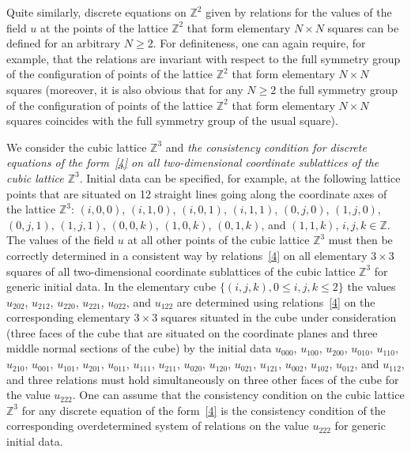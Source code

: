 \documentclass[pdftex]{sigma}
\begin{document}
Quite similarly, discrete equations on $\mathbb{Z}^2$ given by
relations for the values of the f\/ield $u$ at the points of the
lattice $\mathbb{Z}^2$ that form elementary $N \times N$ squares can
be def\/ined for an arbitrary $N \geq 2$. For def\/initeness, one can
again require, for example, that the relations are invariant with
respect to the full symmetry group of the conf\/iguration of points of
the lattice $\mathbb{Z}^2$ that form elementary $N \times N$ squares
(moreover, it is also obvious that for any $N \geq 2$ the full
symmetry group of the conf\/iguration of points of the lattice
$\mathbb{Z}^2$ that form elementary $N \times N$ squares coincides
with the full symmetry group of the usual square).


We consider the cubic lattice $\mathbb{Z}^3$ and {\it the
consistency condition for discrete equations of the form~\eqref{4}
on all two-dimensional coordinate sublattices of the
cubic lattice $\mathbb{Z}^3$}. Initial data can be specif\/ied, for
example, at the following lattice points that are situated on 12
straight lines going along the coordinate axes of the lattice
$\mathbb{Z}^3$: $(i, 0, 0)$, $(i, 1, 0)$, $(i, 0, 1)$, $(i, 1, 1)$,
$(0, j, 0)$, $(1, j, 0)$, $(0, j, 1)$, $(1, j, 1)$, $(0, 0, k)$,
$(1, 0, k)$, $(0, 1, k)$, and $(1, 1, k)$, $i, j, k \in \mathbb{Z}$.
The values of the f\/ield $u$ at all other points of the cubic lattice
$\mathbb{Z}^3$ must then be correctly determined in a consistent way
by relations~\eqref{4} on all elementary $3 \times 3$ squares of all
two-dimensional coordinate sublattices of the cubic lattice
$\mathbb{Z}^3$ for generic initial data. In the elementary cube
$\{(i, j, k), 0 \leq i, j, k \leq 2 \}$ the values $u_{2 0 2}$,
$u_{2 1 2}$, $u_{2 2 0}$, $u_{2 2 1}$, $u_{0 2 2}$, and $u_{1 2 2}$
are determined using relations~\eqref{4} on the corresponding
elementary $3 \times 3$ squares situated in the cube under
consideration (three faces of the cube that are situated on the coordinate planes
and three middle normal sections of the
cube) by the initial data $u_{0 0 0}$, $u_{1 0 0}$, $u_{2 0 0}$,
$u_{0 1 0}$, $u_{1 1 0}$, $u_{2 1 0}$, $u_{0 0 1}$, $u_{1 0 1}$,
$u_{2 0 1}$, $u_{0 1 1}$, $u_{1 1 1}$, $u_{2 1 1}$, $u_{0 2 0}$,
$u_{1 2 0}$, $u_{0 2 1}$, $u_{1 2 1}$, $u_{0 0 2}$, $u_{1 0 2}$,
$u_{0 1 2}$, and $u_{1 1 2}$, and three relations must hold
simultaneously on three other faces of the cube for the value $u_{2 2 2}$.
One can assume that the consistency condition on the cubic lattice
$\mathbb{Z}^3$ for any discrete equation of the form~\eqref{4} is
the consistency condition of the corresponding overdetermined system
of relations on the value $u_{2 2 2}$ for generic initial data.
\end{document}
